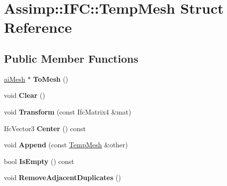 \hypertarget{struct_assimp_1_1_i_f_c_1_1_temp_mesh}{\section{Assimp\+:\+:I\+F\+C\+:\+:Temp\+Mesh Struct Reference}
\label{struct_assimp_1_1_i_f_c_1_1_temp_mesh}
}
\subsection*{Public Member Functions}
\begin{DoxyCompactItemize}
\item 
\hypertarget{struct_assimp_1_1_i_f_c_1_1_temp_mesh_a3b7f4020f480e24224536953ca748bdb}{\hyperlink{structai_mesh}{ai\+Mesh} $\ast$ {\bfseries To\+Mesh} ()}\label{struct_assimp_1_1_i_f_c_1_1_temp_mesh_a3b7f4020f480e24224536953ca748bdb}

\item 
\hypertarget{struct_assimp_1_1_i_f_c_1_1_temp_mesh_a5e7c14a6ea23f139c5d0b1fcb9e0e1fc}{void {\bfseries Clear} ()}\label{struct_assimp_1_1_i_f_c_1_1_temp_mesh_a5e7c14a6ea23f139c5d0b1fcb9e0e1fc}

\item 
\hypertarget{struct_assimp_1_1_i_f_c_1_1_temp_mesh_a6cee533fd767e365a51501e10fff5fdd}{void {\bfseries Transform} (const Ifc\+Matrix4 \&mat)}\label{struct_assimp_1_1_i_f_c_1_1_temp_mesh_a6cee533fd767e365a51501e10fff5fdd}

\item 
\hypertarget{struct_assimp_1_1_i_f_c_1_1_temp_mesh_a155f756d5b98fbc17a906551e2e380f3}{Ifc\+Vector3 {\bfseries Center} () const }\label{struct_assimp_1_1_i_f_c_1_1_temp_mesh_a155f756d5b98fbc17a906551e2e380f3}

\item 
\hypertarget{struct_assimp_1_1_i_f_c_1_1_temp_mesh_ad94b7d1e5257f398ed5e81f19352d863}{void {\bfseries Append} (const \hyperlink{struct_assimp_1_1_i_f_c_1_1_temp_mesh}{Temp\+Mesh} \&other)}\label{struct_assimp_1_1_i_f_c_1_1_temp_mesh_ad94b7d1e5257f398ed5e81f19352d863}

\item 
\hypertarget{struct_assimp_1_1_i_f_c_1_1_temp_mesh_a19cb40b8182934bb01bc5d4014bf060c}{bool {\bfseries Is\+Empty} () const }\label{struct_assimp_1_1_i_f_c_1_1_temp_mesh_a19cb40b8182934bb01bc5d4014bf060c}

\item 
\hypertarget{struct_assimp_1_1_i_f_c_1_1_temp_mesh_a8fd8ae39f1b9d38e981756e0c4d2e172}{void {\bfseries Remove\+Adjacent\+Duplicates} ()}\label{struct_assimp_1_1_i_f_c_1_1_temp_mesh_a8fd8ae39f1b9d38e981756e0c4d2e172}


\end{DoxyCompactItemize}
